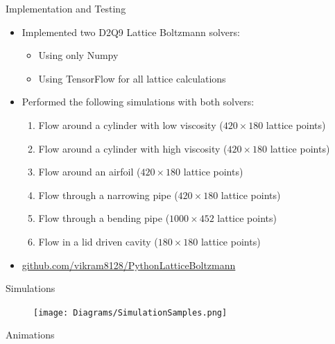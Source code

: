 \documentclass{beamer}
\begin{document}
\begin{frame}{Implementation and Testing}

\begin{itemize}
    \item Implemented two D2Q9 Lattice Boltzmann solvers: 
    \begin{itemize}
        \item Using only Numpy
        \item Using TensorFlow for all lattice calculations
    \end{itemize}
    \vspace{10pt}
    \item Performed the following simulations with both solvers:
    \begin{enumerate}
        \item Flow around a cylinder with low viscosity ($420\times180$ lattice points)
        \item Flow around a cylinder with high viscosity ($420\times180$ lattice points)
        \item Flow around an airfoil ($420\times180$ lattice points)
        \item Flow through a narrowing pipe ($420\times180$ lattice points)
        \item Flow through a bending pipe ($1000\times452$ lattice points)
        \item Flow in a lid driven cavity ($180\times180$ lattice points)
    \end{enumerate}
    \vspace{30pt}
    \item \small\url{github.com/vikram8128/PythonLatticeBoltzmann}
\end{itemize}

\end{frame}


\begin{frame}{Simulations}


\begin{figure}[H] 
	\centering
	\label{videoCuts}
	\texttt{[image: Diagrams/SimulationSamples.png]}
\end{figure}

\end{frame}

\begin{frame}{Animations}

\end{frame}
\end{document}
